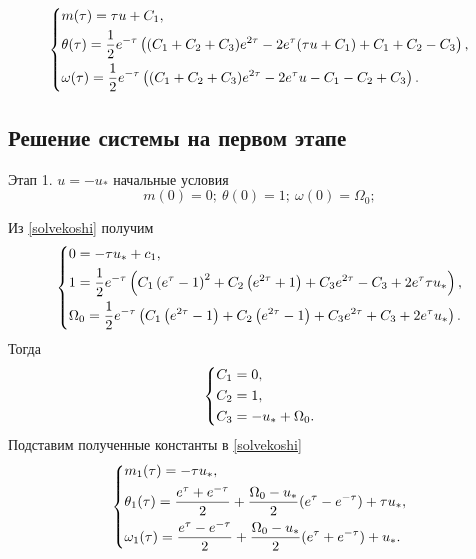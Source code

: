 \documentclass[a4paper,12pt, openany]{book}
\theoremstyle{plain} %
\theoremstyle{definition} %
\theoremstyle{remark} %
\numberwithin{equation}{chapter}
\begin{document}
{\begin{equation}\label{solvekoshi}
    \left\{ {\begin{aligned}
                 & m(\tau) = \tau u+C_1, \hfill                                                            \\
                 & \theta(\tau) = \frac{1}{2} e^{-\tau } \left((C_1+C_2+C_3) e^{2 \tau }-2 e^{\tau } (\tau
                u+C_1)+C_1+C_2-C_3\right), \hfill                                                          \\
                 & \omega(\tau) = \frac{1}{2} e^{-\tau } \left((C_1+C_2+C_3) e^{2 \tau }-2 e^{\tau }
                u-C_1-C_2+C_3\right). \hfill                                                               \\
            \end{aligned}} \right.
\end{equation}

\subsection*{Решение системы на первом этапе}
Этап 1. $u=-u_*$ начальные условия
\[
    m(0)=0;\ \theta(0)=1;\ \omega(0)=\Omega_0;
\]

Из \eqref{solvekoshi} получим
\[
    \left\{ {\begin{aligned}
                 & 0 = -\tau  u_*+c_1, \hfill                                                            \\
                 & 1 = \frac{1}{2} e^{-\tau } \left(C_1 \left(e^{\tau }-1\right)^2+C_2 \left(e^{2
                \tau }+1\right)+C_3 e^{2 \tau }-C_3+2 e^{\tau } \tau  u_*\right) , \hfill                \\
                 & \Omega_0 = \frac{1}{2} e^{-\tau } \left(C_1 \left(e^{2 \tau }-1\right)+C_2 \left(e^{2
                \tau }-1\right)+C_3 e^{2 \tau }+C_3+2 e^{\tau } u_*\right)  . \hfill                     \\
            \end{aligned}} \right.
\]
Тогда
\[
    \left\{ {\begin{aligned}
                 & C_1 = 0, \hfill             \\
                 & C_2 = 1, \hfill             \\
                 & C_3 = -u_*+\Omega_0. \hfill \\
            \end{aligned}} \right.
\]
Подставим полученные константы в \eqref{solvekoshi}
\[
    \left\{ {\begin{aligned}
                 & m_1(\tau) = -\tau  u_*, \hfill                                                                         \\
                 & \theta_1(\tau) = \frac{e^\tau+e^{-\tau}}{2}+\frac{\Omega_0-u_*}{2}(e^\tau-e^{-\tau})+\tau u_* , \hfill \\
                 & \omega_1(\tau) =\frac{e^\tau-e^{-\tau}}{2}+\frac{\Omega_0-u_*}{2}(e^\tau+e^{-\tau})+u_*   . \hfill     \\
            \end{aligned}} \right.
\]
}
\end{document}
